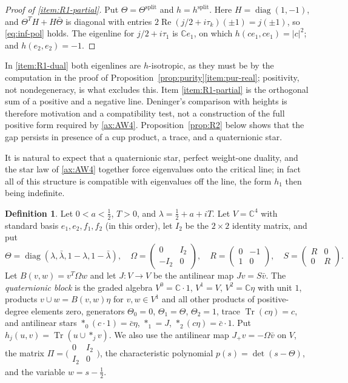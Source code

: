 \documentclass[11pt]{amsart}
\theoremstyle{plain}
\theoremstyle{definition}
\newtheorem{definition}[theorem]{Definition}
\theoremstyle{remark}
\numberwithin{equation}{section}
\newcommand{\C}{\mathbb{C}}
\DeclareMathOperator{\Tr}{Tr}
\DeclareMathOperator{\Rea}{Re}
\DeclareMathOperator{\diag}{diag}
\renewcommand{\Re}{\Rea}
\begin{document}
\begin{proof}[Proof of \ref{item:R1-partial}]
Put $\Theta=\Theta^{\mathrm{split}}$ and $h=h^{\mathrm{split}}$. Here
$H=\diag(1,-1)$, and $\Theta^TH+H\bar\Theta$ is diagonal with
entries $2\Re(j/2+i\tau_k)(\pm1)=j(\pm1)$, so \eqref{eq:inf-pol}
holds. The eigenline for $j/2+i\tau_1$ is $\C e_1$, on which
$h(ce_1,ce_1)=|c|^2$; and $h(e_2,e_2)=-1$.
\end{proof}

In \ref{item:R1-dual} both eigenlines are $h$-isotropic, as they must be
by the computation in the proof of
Proposition~\ref{prop:purity}\ref{item:pur-real}; positivity, not
nondegeneracy, is what excludes this. Item \ref{item:R1-partial} is the
orthogonal sum of a positive and a negative line. Deninger's comparison
with heights \cite[pp.~7--9]{Deninger2010HilbertPolya} is therefore
motivation and a compatibility test, not a construction of the full
positive form required by \ref{ax:AW4}. Proposition~\ref{prop:R2} below
shows that the gap persists in presence of a cup product, a trace, and a
quaternionic star.

It is natural to expect that a quaternionic star, perfect weight-one
duality, and the star law of \ref{ax:AW4} together force eigenvalues onto
the critical line; in fact all of this structure is compatible with
eigenvalues off the line, the form $h_1$ then being indefinite.

\begin{definition}\label{def:R2-block}
Let $0<a<\tfrac12$, $T>0$, and $\lambda=\tfrac12+a+iT$. Let $V=\C^4$ with
standard basis $e_1,e_2,f_1,f_2$ (in this order), let $I_2$ be the
$2\times2$ identity matrix, and put
\[
\Theta=\diag(\lambda,\bar\lambda,1-\lambda,1-\bar\lambda),\quad
\Omega=\begin{pmatrix}0&I_2\\-I_2&0\end{pmatrix},\quad
R=\begin{pmatrix}0&-1\\1&0\end{pmatrix},\quad
S=\begin{pmatrix}R&0\\0&R\end{pmatrix}.
\]
Let $B(v,w)=v^T\Omega w$ and let $J:V\to V$ be the antilinear map
$Jv=S\bar v$. The \emph{quaternionic block} is the graded algebra
$V^0=\C\cdot1$, $V^1=V$, $V^2=\C\eta$ with unit $1$, products
$v\cup w=B(v,w)\eta$ for $v,w\in V^1$ and all other products of
positive-degree elements zero, generators $\Theta_0=0$,
$\Theta_1=\Theta$, $\Theta_2=1$, trace $\Tr(c\eta)=c$, and antilinear
stars $*_0(c\cdot1)=\bar c\eta$, $*_1=J$, $*_2(c\eta)=\bar c\cdot1$.
Put $h_j(u,v)=\Tr(u\cup*_jv)$. We also use the antilinear map
$J_+v=-\Omega\bar v$ on $V$, the matrix
$\Pi=\bigl(\begin{smallmatrix}0&I_2\\I_2&0\end{smallmatrix}\bigr)$, the
characteristic polynomial $p(s)=\det(s-\Theta)$, and the variable
$w=s-\tfrac12$.
\end{definition}
\end{document}
